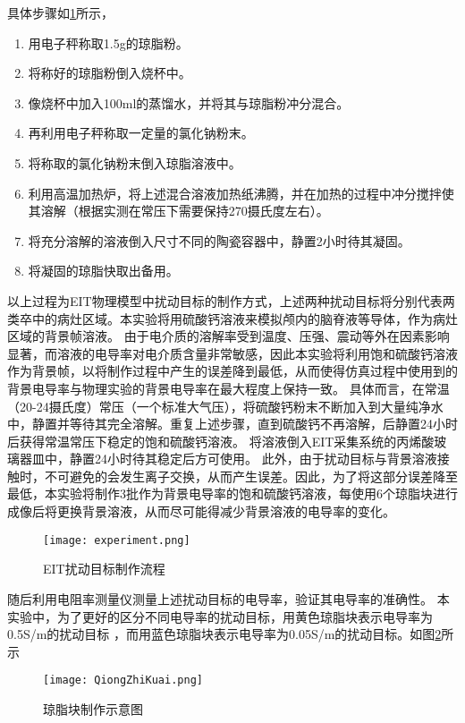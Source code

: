 具体步骤如\cref{figure:experiment}所示，
\begin{enumerate}
    \item 用电子秤称取1.5g的琼脂粉。
    \item 将称好的琼脂粉倒入烧杯中。
    \item 像烧杯中加入100ml的蒸馏水，并将其与琼脂粉冲分混合。
    \item 再利用电子秤称取一定量的氯化钠粉末。
    \item 将称取的氯化钠粉末倒入琼脂溶液中。
    \item 利用高温加热炉，将上述混合溶液加热纸沸腾，并在加热的过程中冲分搅拌使其溶解（根据实测在常压下需要保持270摄氏度左右）。
    \item 将充分溶解的溶液倒入尺寸不同的陶瓷容器中，静置2小时待其凝固。
    \item 将凝固的琼脂快取出备用。
\end{enumerate}

以上过程为EIT物理模型中扰动目标的制作方式，上述两种扰动目标将分别代表两类卒中的病灶区域。本实验将用硫酸钙溶液来模拟颅内的脑脊液等导体，作为病灶区域的背景帧溶液。
由于电介质的溶解率受到温度、压强、震动等外在因素影响显著，而溶液的电导率对电介质含量非常敏感，因此本实验将利用饱和硫酸钙溶液作为背景帧，以将制作过程中产生的误差降到最低，从而使得仿真过程中使用到的背景电导率与物理实验的背景电导率在最大程度上保持一致。
具体而言，在常温（20-24摄氏度）常压（一个标准大气压），将硫酸钙粉末不断加入到大量纯净水中，静置并等待其完全溶解。重复上述步骤，直到硫酸钙不再溶解，后静置24小时后获得常温常压下稳定的饱和硫酸钙溶液。
将溶液倒入EIT采集系统的丙烯酸玻璃器皿中，静置24小时待其稳定后方可使用。
此外，由于扰动目标与背景溶液接触时，不可避免的会发生离子交换，从而产生误差。因此，为了将这部分误差降至最低，本实验将制作3批作为背景电导率的饱和硫酸钙溶液，每使用6个琼脂块进行成像后将更换背景溶液，从而尽可能得减少背景溶液的电导率的变化。



\begin{figure}[H]
    \centering
    \texttt{[image: experiment.png]}
    \caption{EIT扰动目标制作流程}
    \label{figure:experiment}
\end{figure}

随后利用电阻率测量仪测量上述扰动目标的电导率，验证其电导率的准确性。
本实验中，为了更好的区分不同电导率的扰动目标，用黄色琼脂块表示电导率为0.5S/m的扰动目标
，而用蓝色琼脂块表示电导率为0.05S/m的扰动目标。如图\cref{figure:QiongZhiKuai}所示

\begin{figure}[h]
    \centering

    \texttt{[image: QiongZhiKuai.png]}
    \caption{琼脂块制作示意图}
    \label{figure:QiongZhiKuai}
\end{figure}


